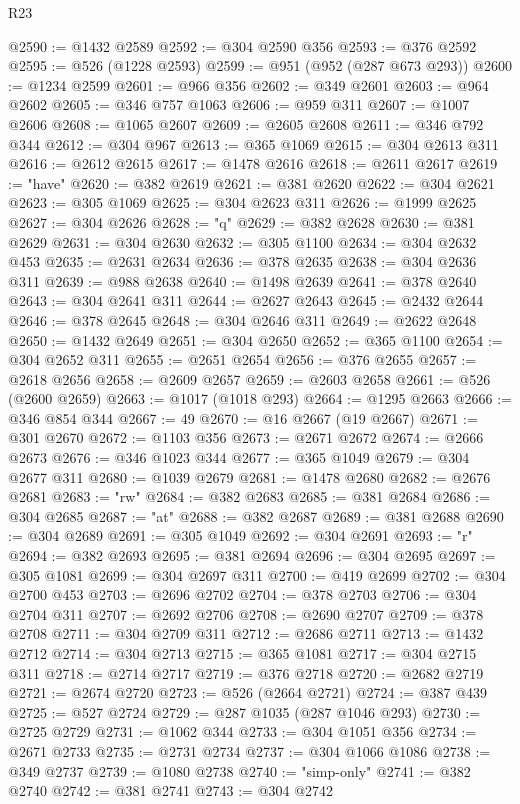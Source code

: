 \begin{lexlean}{R23}
\begin{coremodule}
@2590 := @1432 @2589
@2592 := @304 @2590 @356
@2593 := @376 @2592
@2595 := @526 (@1228 @2593)
@2599 := @951 (@952 (@287 @673 @293))
@2600 := @1234 @2599
@2601 := @966 @356
@2602 := @349 @2601
@2603 := @964 @2602
@2605 := @346 @757 @1063
@2606 := @959 @311
@2607 := @1007 @2606
@2608 := @1065 @2607
@2609 := @2605 @2608
@2611 := @346 @792 @344
@2612 := @304 @967
@2613 := @365 @1069
@2615 := @304 @2613 @311
@2616 := @2612 @2615
@2617 := @1478 @2616
@2618 := @2611 @2617
@2619 := "have"
@2620 := @382 @2619
@2621 := @381 @2620
@2622 := @304 @2621
@2623 := @305 @1069
@2625 := @304 @2623 @311
@2626 := @1999 @2625
@2627 := @304 @2626
@2628 := "q"
@2629 := @382 @2628
@2630 := @381 @2629
@2631 := @304 @2630
@2632 := @305 @1100
@2634 := @304 @2632 @453
@2635 := @2631 @2634
@2636 := @378 @2635
@2638 := @304 @2636 @311
@2639 := @988 @2638
@2640 := @1498 @2639
@2641 := @378 @2640
@2643 := @304 @2641 @311
@2644 := @2627 @2643
@2645 := @2432 @2644
@2646 := @378 @2645
@2648 := @304 @2646 @311
@2649 := @2622 @2648
@2650 := @1432 @2649
@2651 := @304 @2650
@2652 := @365 @1100
@2654 := @304 @2652 @311
@2655 := @2651 @2654
@2656 := @376 @2655
@2657 := @2618 @2656
@2658 := @2609 @2657
@2659 := @2603 @2658
@2661 := @526 (@2600 @2659)
@2663 := @1017 (@1018 @293)
@2664 := @1295 @2663
@2666 := @346 @854 @344
@2667 := 49
@2670 := @16 @2667 (@19 @2667)
@2671 := @301 @2670
@2672 := @1103 @356
@2673 := @2671 @2672
@2674 := @2666 @2673
@2676 := @346 @1023 @344
@2677 := @365 @1049
@2679 := @304 @2677 @311
@2680 := @1039 @2679
@2681 := @1478 @2680
@2682 := @2676 @2681
@2683 := "rw"
@2684 := @382 @2683
@2685 := @381 @2684
@2686 := @304 @2685
@2687 := "at"
@2688 := @382 @2687
@2689 := @381 @2688
@2690 := @304 @2689
@2691 := @305 @1049
@2692 := @304 @2691
@2693 := "r"
@2694 := @382 @2693
@2695 := @381 @2694
@2696 := @304 @2695
@2697 := @305 @1081
@2699 := @304 @2697 @311
@2700 := @419 @2699
@2702 := @304 @2700 @453
@2703 := @2696 @2702
@2704 := @378 @2703
@2706 := @304 @2704 @311
@2707 := @2692 @2706
@2708 := @2690 @2707
@2709 := @378 @2708
@2711 := @304 @2709 @311
@2712 := @2686 @2711
@2713 := @1432 @2712
@2714 := @304 @2713
@2715 := @365 @1081
@2717 := @304 @2715 @311
@2718 := @2714 @2717
@2719 := @376 @2718
@2720 := @2682 @2719
@2721 := @2674 @2720
@2723 := @526 (@2664 @2721)
@2724 := @387 @439
@2725 := @527 @2724
@2729 := @287 @1035 (@287 @1046 @293)
@2730 := @2725 @2729
@2731 := @1062 @344
@2733 := @304 @1051 @356
@2734 := @2671 @2733
@2735 := @2731 @2734
@2737 := @304 @1066 @1086
@2738 := @349 @2737
@2739 := @1080 @2738
@2740 := "simp-only"
@2741 := @382 @2740
@2742 := @381 @2741
@2743 := @304 @2742

\end{coremodule}
\end{lexlean}
